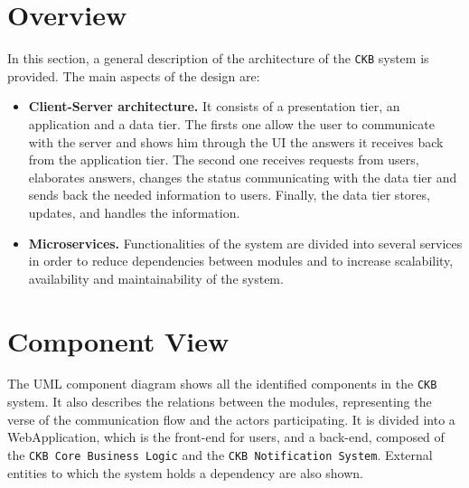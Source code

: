 \section{Overview}
\label{sec: overview}%
In this section, a general description of the architecture of the \verb|CKB| system is provided.
The main aspects of the design are:
\begin{itemize}
    \item \textbf{Client-Server architecture. } It consists of a presentation tier, an application and a data tier.
    The firsts one allow the user to communicate with the server and shows him through the UI the answers it receives back from the application tier.
    The second one receives requests from users, elaborates answers, changes the status communicating with the data tier and sends back the needed information to users.
    Finally, the data tier stores, updates, and handles the information.
    \item \textbf{Microservices. } Functionalities of the system are divided into several services in order to reduce dependencies between
    modules and to increase scalability, availability and maintainability of the system.
\end{itemize}

\newpage
\section{Component View}
\label{sec: component_view}%
The UML component diagram shows all the identified components in the \verb|CKB| system.
It also describes the relations between the modules, representing the verse of the communication flow and the actors participating.
It is divided into a WebApplication, which is the front-end for users, and a back-end, composed of the \verb|CKB Core Business Logic| and the \verb|CKB Notification System|.
External entities to which the system holds a dependency are also shown.

